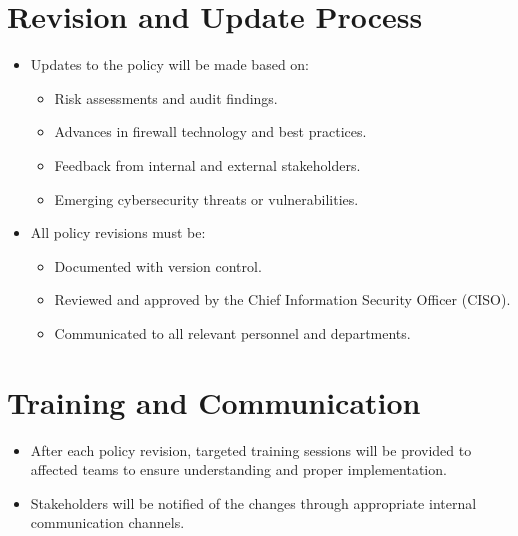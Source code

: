 \section{Revision and Update Process}

\begin{itemize}
    \item Updates to the policy will be made based on:
    
    \begin{itemize}
    \item Risk assessments and audit findings.
    
    \item Advances in firewall technology and best practices.
    
    \item Feedback from internal and external stakeholders.

    \item Emerging cybersecurity threats or vulnerabilities.
\end{itemize}
\end{itemize}

\begin{itemize}
    \item All policy revisions must be:

\begin{itemize}
    \item Documented with version control.
    
    \item Reviewed and approved by the Chief Information Security Officer (CISO).
    
    \item Communicated to all relevant personnel and departments.

\end{itemize}
\end{itemize}
\section{Training and Communication}
\begin{itemize}
    \item After each policy revision, targeted training sessions will be provided to affected teams to ensure understanding and proper implementation.
    
    \item Stakeholders will be notified of the changes through appropriate internal communication channels.

\end{itemize}

